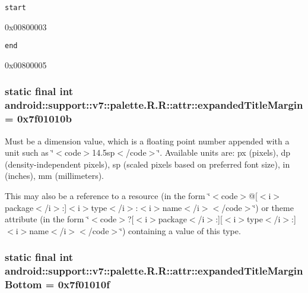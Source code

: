 {\tt start}

0x00800003

{\tt end}

0x00800005\hypertarget{classandroid_1_1support_1_1v7_1_1palette_1_1_r_1_1attr_aa09b1a509804b422a25e4f8bcd778b4}{
\subsubsection[{expandedTitleMargin}]{\setlength{\rightskip}{0pt plus 5cm}static final int android::support::v7::palette.R.R::attr::expandedTitleMargin = 0x7f01010b}}
\label{classandroid_1_1support_1_1v7_1_1palette_1_1_r_1_1attr_aa09b1a509804b422a25e4f8bcd778b4}


Must be a dimension value, which is a floating point number appended with a unit such as \char`\"{}$<$code$>$14.5sp$<$/code$>$\char`\"{}. Available units are: px (pixels), dp (density-independent pixels), sp (scaled pixels based on preferred font size), in (inches), mm (millimeters). 

This may also be a reference to a resource (in the form \char`\"{}$<$code$>$@\mbox{[}$<$i$>$package$<$/i$>$:\mbox{]}$<$i$>$type$<$/i$>$:$<$i$>$name$<$/i$>$$<$/code$>$\char`\"{}) or theme attribute (in the form \char`\"{}$<$code$>$?\mbox{[}$<$i$>$package$<$/i$>$:\mbox{]}\mbox{[}$<$i$>$type$<$/i$>$:\mbox{]}$<$i$>$name$<$/i$>$$<$/code$>$\char`\"{}) containing a value of this type. \hypertarget{classandroid_1_1support_1_1v7_1_1palette_1_1_r_1_1attr_c18308d0644ca1262a79d7835ce84bcf}{
\subsubsection[{expandedTitleMarginBottom}]{\setlength{\rightskip}{0pt plus 5cm}static final int android::support::v7::palette.R.R::attr::expandedTitleMarginBottom = 0x7f01010f}}
\label{classandroid_1_1support_1_1v7_1_1palette_1_1_r_1_1attr_c18308d0644ca1262a79d7835ce84bcf}


